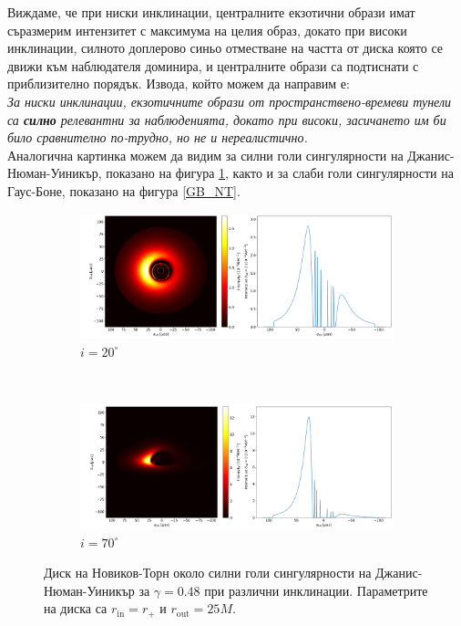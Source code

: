 Виждаме, че при ниски инклинации, централните екзотични образи имат съразмерим интензитет с максимума на целия образ, докато при високи инклинации, силното доплерово синьо отместване на частта от диска която се движи към наблюдателя доминира, и централните образи са подтиснати с приблизително порядък. Извода, който можем да направим е:\\

\emph{За ниски инклинации, екзотичните образи от пространствено-времеви тунели са \textbf{силно} релевантни за наблюденията, докато при високи, засичането им би било сравнително по-трудно, но не и нереалистично.} \\

Аналогична картинка можем да видим за силни голи сингулярности на Джанис-Нюман-Уиникър, показано на фигура \ref{JNW_NT}, както и за слаби голи сингулярности на Гаус-Боне, показано на фигура \ref{GB_NT}.

\begin{figure}[!htb]
	\centering
	\begin{subfigure}{12cm}
		\hspace{-0.6cm}
		\includegraphics[scale = 0.26]{JNW_NT_Gamma0.48_20_deg.png}
		\caption{$i = 20^\circ$} 
	\end{subfigure}\\
	\begin{subfigure}{12cm}
		\hspace{-0.6cm}
		\includegraphics[scale = 0.26]{JNW_NT_Gamma0.48_70_deg.png}
		\caption{$i = 70^\circ$} 
	\end{subfigure}
	\caption[Диск на Новиков-Торн около силни голи сингулярности на Джанис-Нюман-Уиникър при различни инклинации.]{\small Диск на Новиков-Торн около силни голи сингулярности на Джанис-Нюман-Уиникър за $\gamma = 0.48$ при различни инклинации. Параметрите на диска са $r_\text{in} = r_\text{+}$ и $r_\text{out} = 25M$.} 
	\label{JNW_NT}
\end{figure}

